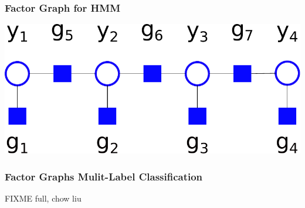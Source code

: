 \documentclass[final,ignorenonframetext,compress]{beamer}
\begin{document}
\begin{frame}
    \frametitle{Factor Graph for HMM}
    \begin{center}
        \includegraphics[width=.8\textwidth]{images/hmm_white_bg}
    \end{center}
\end{frame}

\begin{frame}
    \frametitle{Factor Graphs Mulit-Label Classification}
    \begin{center}
    \end{center}
    FIXME full, chow liu
\end{frame}
\end{document}
